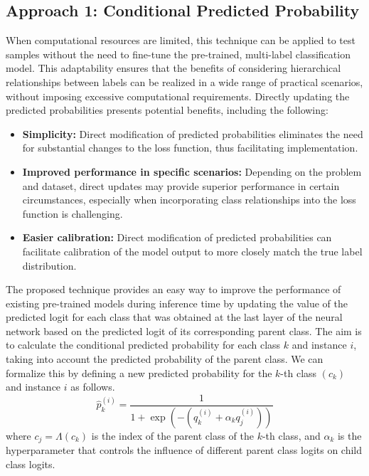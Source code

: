\documentclass[review,1p,times,numbers]{elsarticle}
\begin{document}
\subsection{Approach 1: Conditional Predicted Probability}\label{subsec:taxonomy.method.approach1}
When computational resources are limited, this technique can be applied to test samples without the need to fine-tune the pre-trained, multi-label classification model. This adaptability ensures that the benefits of considering hierarchical relationships between labels can be realized in a wide range of practical scenarios, without imposing excessive computational requirements.
Directly updating the predicted probabilities presents potential benefits, including the following:
\begin{itemize}
    \item  \textbf{Simplicity:} Direct modification of predicted probabilities eliminates the need for substantial changes to the loss function, thus facilitating implementation.
    \item  \textbf{Improved performance in specific scenarios:} Depending on the problem and dataset, direct updates may provide superior performance in certain circumstances, especially when incorporating class relationships into the loss function is challenging.
    \item  \textbf{Easier calibration:} Direct modification of predicted probabilities can facilitate calibration of the model output to more closely match the true label distribution.
\end{itemize}

The proposed technique provides an easy way to improve the performance of existing pre-trained models during inference time by updating the value of the predicted logit for each class that was obtained at the last layer of the neural network based on the predicted logit of its corresponding parent class. The aim is to calculate the conditional predicted probability for each class $k $ and instance $i $, taking into account the predicted probability of the parent class. We can formalize this by defining a new predicted probability for the $k$-th class $(c_k) $ and instance $i $ as follows.
\begin{equation}
    \widehat{p}_k^{(i)} = \frac{1}{ 1 + \exp \left(-\left(q_k^{(i)} + \alpha_k q_j^{(i)} \right)\right) }
    \label{eq:taxonomy.eq.1.pred.approach1}
\end{equation}
where $c_j = \Lambda (c_k)$ is the index of the parent class of the $k$-th class, and $\alpha_k $ is the hyperparameter that controls the influence of different parent class logits on child class logits.
\end{document}
